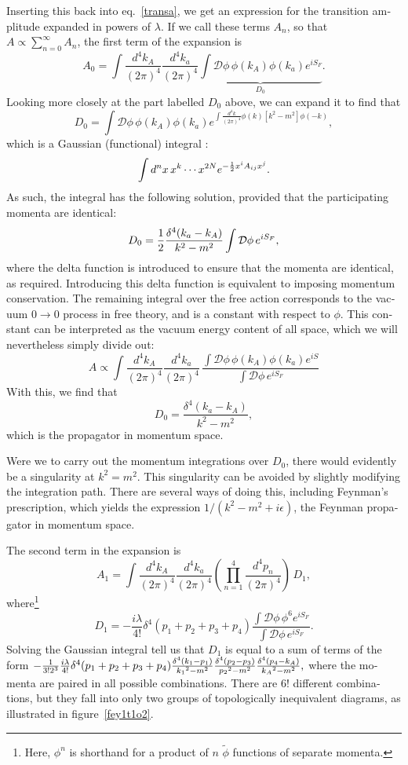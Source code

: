 \begin{english}
Inserting this back into eq.~\eqref{transa}, we get an expression for the transition amplitude expanded in powers of $\lambda$. If we call these terms $A_n$, so that $A\propto\sum_{n=0}^\infty A_n$, the first term of the expansion is
\[A_0=\int\frac{d^4k_A}{(2\pi)^4}\frac{d^4k_a}{(2\pi)^4}\underbrace{\int\mathcal D\phi\,\phi(k_A)\phi(k_a)e^{iS_F}}_{D_0}.\]
Looking more closely at the part labelled $D_0$ above, we can expand it to find that
\[D_0=\int\mathcal D\phi\,\phi(k_A)\phi(k_a)e^{\int\frac{d^4k}{(2\pi)^4}\phi(k)[k^2-m^2]\phi(-k)},\]
which is a Gaussian (functional) integral \cite{armbjorn}:
\[\int d^nx\,x^k\cdots x^{2N}e^{-\frac{1}{2} x^iA_{ij}x^j}.\label{gausint}\]
As such, the integral has the following solution, provided that the participating momenta are identical:
\[D_0=\frac{1}{2}\frac{\delta^4(k_a-k_A)}{k^2-m^2}\int\mathcal D\phi\,e^{iS_F},\]
where the delta function is introduced to ensure that the momenta are identical, as required. Introducing this delta function is equivalent to imposing momentum conservation. The remaining integral over the free action corresponds to the vacuum $0\rightarrow0$ process in free theory, and is a constant with respect to $\phi$. This constant can be interpreted as the vacuum energy content of all space, which we will nevertheless simply divide out:
\[A\propto\int\frac{d^4k_A}{(2\pi)^4}\frac{d^4k_a}{(2\pi)^4}\,\frac{\int\mathcal D\phi\,\phi(k_A)\phi(k_a)e^{iS}}{\int\mathcal D\phi\,e^{iS_F}}\]
With this, we find that 
\[D_0=\frac{\delta^4(k_a-k_A)}{k^2-m^2},\]
which is the propagator in momentum space.


Were we to carry out the momentum integrations over $D_0$, there would evidently be a singularity at $k^2=m^2$. This singularity can be avoided by slightly modifying the integration path. There are several ways of doing this, including Feynman's prescription, which yields the expression $1/(k^2-m^2+i\epsilon)$, the Feynman propagator in momentum space. 


The second term in the expansion is
\[A_1=\int\frac{d^4k_A}{(2\pi)^4}\frac{d^4k_a}{(2\pi)^4}\left(\prod_{n=1}^4\frac{d^4p_n}{(2\pi)^4}\right)\,D_1,\]
where\footnote{Here, $\phi^n$ is shorthand for a product of $n$ $\tilde\phi$ functions of separate momenta.}
\[D_1=-\frac{i\lambda}{4!}\delta^4(p_1+p_2+p_3+p_4)\frac{\int\mathcal D\phi\,\phi^6e^{iS_F}}{\int\mathcal D\phi\,e^{iS_F}}.\] 
Solving the Gaussian integral tell us that $D_1$ is equal to a sum of terms of the form 
\(-\frac{1}{3!2^3}\frac{i\lambda}{4!}\delta^4(p_1+p_2+p_3+p_4)\frac{\delta^4(k_1-p_1)}{{k_1}^2-m^2}\frac{\delta^4(p_2-p_3)}{{p_2}^2-m^2}\frac{\delta^4(p_4-k_A)}{{k_A}^2-m^2},\label{1t1f}\)
where the momenta are paired in all possible combinations. There are $6!$ different combinations, but they fall into only two groups of topologically inequivalent diagrams, as illustrated in figure~\ref{fey1t1o2}.



\end{english}

